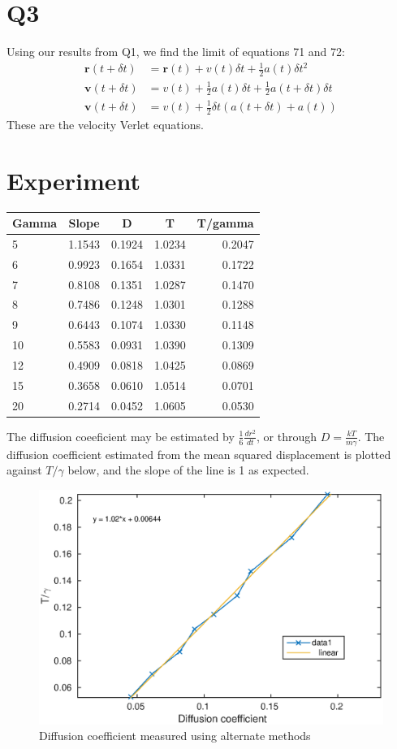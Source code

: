\documentclass[a4paper,11pt]{article}
\numberwithin{equation}{section}
\newcommand{\bv}[1]{\mathbf{#1}}
\begin{document}
\section{Q3}
Using our results from Q1, we find the limit of equations 71 and 72:
\begin{align}
 \bv{r}(t+\delta t) &= \bv{r}(t) + v(t)\delta t + \frac{1}{2}a(t)\delta t^2\\
 \bv{v}(t+\delta t) &= v(t) +\frac{1}{2}a(t)\delta t + \frac{1}{2}a(t+\delta t)\delta t\\
 \bv{v}(t+\delta t) &= v(t) +\frac{1}{2}\delta t (a(t+\delta t) +a(t)) 
\end{align}
These are the velocity Verlet equations.

\section{Experiment}
\begin{tabular}{l | c | c | c | r}
 Gamma & Slope & D & T & T/gamma \\
 \hline
 5 & 1.1543 & 0.1924 & 1.0234 & 0.2047 \\
 6 & 0.9923 & 0.1654 & 1.0331 & 0.1722 \\
 7 & 0.8108 & 0.1351 & 1.0287 & 0.1470 \\
 8 & 0.7486 & 0.1248 & 1.0301 & 0.1288 \\
 9 & 0.6443 & 0.1074 & 1.0330 & 0.1148 \\
 10 & 0.5583 & 0.0931 & 1.0390 & 0.1309 \\
 12 & 0.4909 & 0.0818 & 1.0425 & 0.0869 \\
 15 & 0.3658 & 0.0610 & 1.0514 & 0.0701 \\
 20 & 0.2714 & 0.0452 & 1.0605 & 0.0530 \\
 \hline
\end{tabular}

The diffusion coeeficient may be estimated by  $\frac{1}{6}\frac{d r^2}{dt}$, or through $D=\frac{kT}{m\gamma}$.
The diffusion coefficient estimated from the mean squared displacement is plotted against $T/\gamma$ below, and the slope of the line is 1 as expected.
\begin{figure}[h]
 \caption{Diffusion coefficient measured using alternate methods}
 \centering
   \includegraphics[width=\textwidth]{DC_vs_ty}
\end{figure}
\end{document}
